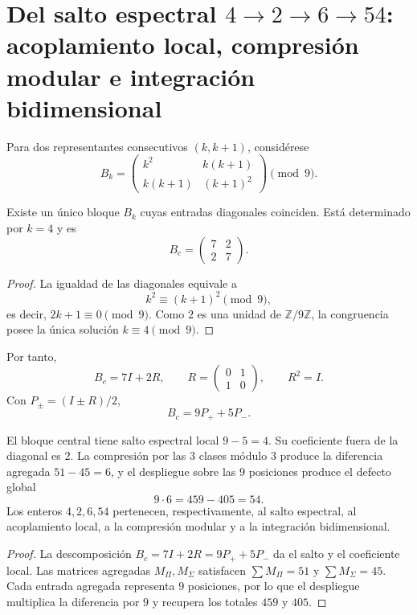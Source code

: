 \section{Del salto espectral \texorpdfstring{\(4\to2\to6\to54\)}{4 a 2 a 6 a 54}: acoplamiento local, compresión modular e integración bidimensional}
\label{sec:sucesor83-salto-espectral-4-2-6-54}

Para dos representantes consecutivos \((k,k+1)\), considérese
\[
B_k=
\begin{pmatrix}
k^2&k(k+1)\\
k(k+1)&(k+1)^2
\end{pmatrix}\pmod 9.
\]

\begin{theorem}
\label{thm:sucesor83-app-bloque-central}
Existe un único bloque \(B_k\) cuyas entradas diagonales coinciden. Está
determinado por \(k=4\) y es
\[
B_c=\begin{pmatrix}7&2\\2&7\end{pmatrix}.
\]
\end{theorem}

\begin{proof}
La igualdad de las diagonales equivale a
\[
k^2\equiv(k+1)^2\pmod 9,
\]
es decir, \(2k+1\equiv0\pmod 9\). Como \(2\) es una unidad de
\(\mathbb Z/9\mathbb Z\), la congruencia posee la única solución
\(k\equiv4\pmod 9\).
\end{proof}

Por tanto,
\[
B_c=7I+2R,
\qquad
R=\begin{pmatrix}0&1\\1&0\end{pmatrix},
\qquad R^2=I.
\]
Con \(P_\pm=(I\pm R)/2\),
\[
B_c=9P_++5P_-.
\]

\begin{theorem}
\label{thm:sucesor83-app-jerarquia-4-2-6-54}
El bloque central tiene salto espectral local \(9-5=4\). Su coeficiente
fuera de la diagonal es \(2\). La compresión por las \(3\) clases módulo
\(3\) produce la diferencia agregada \(51-45=6\), y el despliegue sobre las
\(9\) posiciones produce el defecto global
\[
9\cdot6=459-405=54.
\]
Los enteros \(4,2,6,54\) pertenecen, respectivamente, al salto espectral,
al acoplamiento local, a la compresión modular y a la integración
bidimensional.
\end{theorem}

\begin{proof}
La descomposición \(B_c=7I+2R=9P_++5P_-\) da el salto y el coeficiente
local. Las matrices agregadas \(M_\Pi,M_\Sigma\) satisfacen
\(\sum M_\Pi=51\) y \(\sum M_\Sigma=45\). Cada entrada agregada representa
\(9\) posiciones, por lo que el despliegue multiplica la diferencia por
\(9\) y recupera los totales \(459\) y \(405\).
\end{proof}

